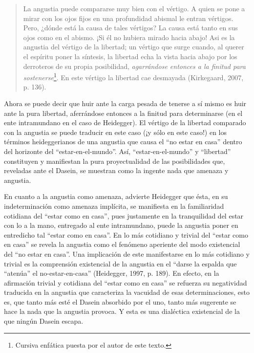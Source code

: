 \documentclass[]{article}
\begin{document}
\begin{quote}
La angustia puede compararse muy bien con el vértigo. A quien se pone a mirar con los ojos fijos en una profundidad abismal le entran vértigos. Pero, ¿dónde está la causa de tales vértigos? La causa está tanto en sus ojos como en el abismo. ¡Si él no hubiera mirado hacia abajo! Asi es la angustia del vértigo de la libertad; un vértigo que surge cuando, al querer el espíritu poner la síntesis, la libertad echa la vista hacia abajo por los derroteros de su propia posibilidad, \emph{agarrándose entonces a la finitud para sostenerse}\footnote{Cursiva enfática puesta por el autor de este texto.}. En este vértigo la libertad cae desmayada (Kirkegaard, 2007, p. 136).
\end{quote}

Ahora se puede decir que huir ante la carga pesada de tenerse a sí mismo es huir ante la pura libertad, aferrándose entonces a la finitud para determinarse (en el ente intramundano en el caso de Heidegger). El vértigo de la libertad comparado con la angustia se puede traducir en este caso (¡y sólo en este caso!) en los términos heideggerianos de una angustia que causa el ``no estar en casa'' dentro del horizonte del ``estar-en-el-mundo''. Así, ``estar-en-el-mundo'' y ``libertad'' constituyen y manifiestan la pura proyectualidad de las posibilidades que, reveladas ante el Dasein, se muestran como la ingente nada que amenaza y angustia.

En cuanto a la angustia como amenaza, advierte Heidegger que ésta, en su indeterminación como amenaza implícita, se manifiesta en la familiaridad cotidiana del ``estar como en casa'', pues justamente en la tranquilidad del estar con lo a la mano, entregado al ente intramundano, puede la angustia poner en entredicho tal ``estar como en casa''. En lo más cotidiano y trivial del ``estar como en casa'' se revela la angustia como el fenómeno aperiente del modo existencial del ``no estar en casa''. Una implicación de este manifestarse en lo más cotidiano y trivial es la comprensión existencial de la angustia en el ``darse la espalda que ``atenúa'' el no-estar-en-casa'' (Heidegger, 1997, p. 189). En efecto, en la afirmación trivial y cotidiana del ``estar como en casa'' se refuerza su negatividad traducida en la angustia que caracteriza la vacuidad de esas determinaciones, esto es, que tanto más esté el Dasein absorbido por el uno, tanto más sugerente se hace la nada que la angustia provoca. Y esta es una dialéctica existencial de la que ningún Dasein escapa.
\end{document}
